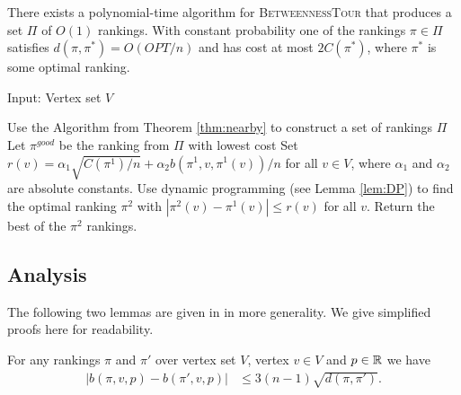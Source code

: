 \documentclass[envcountsame,oribibl]{llncs}
\newcommand{\betTour}{\textsc{BetweennessTour}}
\begin{document}
\begin{theorem} \label{thm:nearby}
There exists a polynomial-time algorithm for \betTour{} that produces a set $\Pi$ of $O(1)$ rankings. With constant probability one of the rankings $\pi\in\Pi$ satisfies  $d(\pi,\pi^*)=O(OPT/n)$ and has cost at most $2C(\pi^*)$, where $\pi^*$ is some optimal ranking.
\end{theorem}

\begin{algorithm}[t]
Input: Vertex set $V$
\begin{algorithmic}[1]
 \STATE Use the Algorithm from Theorem \ref{thm:nearby} to construct a set of rankings $\Pi$
 \STATE Let $\pi^{good}$ be the ranking from $\Pi$ with lowest cost
  \STATE Set $r(v) = \alpha_1\sqrt{C(\pi^1) / n} + \alpha_2 b(\pi^1,v,\pi^1(v))/n$ for all $v \in V$, where $\alpha_1$ and $\alpha_2$ are absolute constants.
  \STATE Use dynamic programming (see Lemma \ref{lem:DP}) to find the optimal ranking $\pi^2$ with $|\pi^2(v) - \pi^1(v)| \le r(v)$ for all $v$.
 \ENDIF
\ENDFOR
\STATE Return the best of the $\pi^2$ rankings.
\end{algorithmic}

\caption{Our algorithm for \betTour. The runtime is $n^{O(1)} 2^{O(\sqrt{OPT/n})}$. }
\label{alg:exactGen}
\end{algorithm}



\subsection{Analysis}  \label{sec:betAnalysis}

The following two lemmas are given in \cite{Karpinski09betweenness} in more generality. We give simplified proofs here for readability.

\begin{lemma}\label{lem:bChangeFirst}
For any rankings $\pi$ and $\pi'$ over vertex set $V$, vertex $v \in V$ and $p \in \mathbb{R}$ we have
\begin{align*}
|b(\pi, v, p) - b(\pi', v, p)|
&\le 3(n-1)\sqrt{d(\pi, \pi')}
.\end{align*}
\end{lemma}
\end{document}
